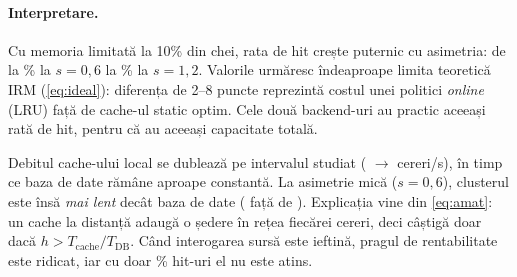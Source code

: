 \paragraph{Interpretare.} Cu memoria limitată la 10\% din chei, rata de hit crește puternic cu asimetria:
de la \% la $s=0{,}6$ la \% la $s=1{,}2$. Valorile urmăresc
îndeaproape limita teoretică IRM (\cref{eq:ideal}): diferența de 2–8 puncte reprezintă costul unei politici
\emph{online} (LRU) față de cache-ul static optim. Cele două backend-uri au practic aceeași rată de hit, pentru
că au aceeași capacitate totală.

Debitul cache-ului local se dublează pe intervalul studiat ( $\rightarrow$
 cereri/s), în timp ce baza de date rămâne aproape constantă. La asimetrie mică
($s=0{,}6$), clusterul este însă \emph{mai lent} decât baza de date ( față de
). Explicația vine din \cref{eq:amat}: un cache la distanță adaugă o ședere în
rețea fiecărei cereri, deci câștigă doar dacă $h > T_{\text{cache}}/T_{\text{DB}}$. Când interogarea sursă este
ieftină, pragul de rentabilitate este ridicat, iar cu doar \% hit-uri el nu este atins.
